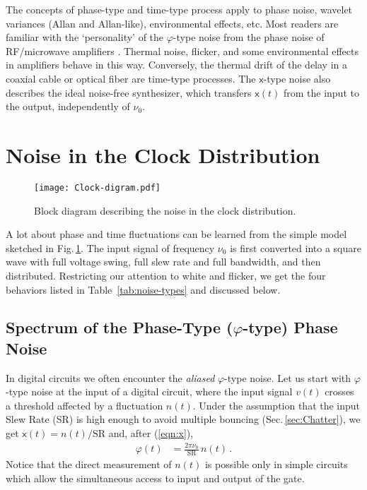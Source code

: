 \documentclass{article}
\newcommand{\req}[1]{(\ref{#1})}
\begin{document}
The concepts of phase-type and time-type process apply to phase noise, wavelet variances (Allan and Allan-like), environmental effects, etc.
Most readers are familiar with the `personality' of the $\varphi$-type noise from the phase noise of RF/microwave amplifiers \cite{Boudot-2012}.  
Thermal noise, flicker, and some environmental effects in amplifiers behave in this way.  
Conversely, the thermal drift of the delay in a coaxial cable or optical fiber are time-type processes.
The $\mathsf{x}$-type noise also describes the ideal noise-free synthesizer, which transfers $\mathsf{x}(t)$ from the input to the output, independently of $\nu_0$.


\section{Noise in the Clock Distribution}\label{ssec:processes}
\begin{figure}
\centering\texttt{[image: Clock-digram.pdf]}
\caption{Block diagram describing the noise in the clock distribution.}
\label{fig:Clock-digram}
\end{figure}



A lot about phase and time fluctuations can be learned from the simple model sketched in Fig.\,\ref{fig:Clock-digram}.
The input signal of frequency $\nu_0$ is first converted into a square wave with full voltage swing, full slew rate and full bandwidth, and then distributed.  
Restricting our attention to white and flicker, we get the four behaviors listed in Table~\ref{tab:noise-types} and discussed below.



\subsection{Spectrum of the Phase-Type ($\varphi$-type) Phase Noise}\label{ssec:phi-type}
In digital circuits we often encounter the \emph{aliased} $\varphi$-type noise.
Let us start with $\varphi$-type noise at the input of a digital circuit, where the input signal $v(t)$ crosses a threshold affected by a fluctuation $n(t)$.  Under the assumption that the input Slew Rate (SR) is high enough to avoid multiple bouncing (Sec.\,\ref{sec:Chatter}), we get
$\mathsf{x}(t)=n(t)/\mathrm{SR}$ and, after \req{eqn:x},
\begin{align}
\varphi(t)&=\frac{2\pi\nu_0}{\mathrm{SR}}\,n(t)\,.
\label{eqn:n-to-phi-conv}
\end{align}
Notice that the direct measurement of $n(t)$ is possible only in simple circuits which allow the simultaneous access to input and output of the gate.  
\end{document}
